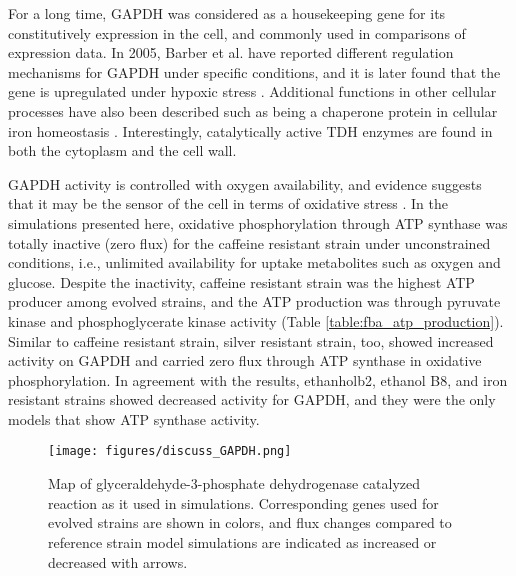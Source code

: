 For a long time, GAPDH was considered as a housekeeping gene for its constitutively expression in the cell, and commonly used in comparisons of expression data. In 2005, Barber et al. have reported different regulation mechanisms for GAPDH under specific conditions\cite{barber2005gapdh}, and it is later found that the gene is upregulated under hypoxic stress \cite{yang2008effects}. Additional functions in other cellular processes have also been described such as being a chaperone protein in cellular iron homeostasis \cite{sweeny2018glyceraldehyde}. Interestingly, catalytically active TDH enzymes are found in both the cytoplasm and the cell wall.

GAPDH activity is controlled with oxygen availability, and evidence suggests that it may be the sensor of the cell in terms of oxidative stress \cite{chuang2005glyceraldehyde}. In the simulations presented here, oxidative phosphorylation through ATP synthase was totally inactive (zero flux) for the caffeine resistant strain under unconstrained conditions, i.e., unlimited availability for uptake metabolites such as oxygen and glucose. Despite the inactivity, caffeine resistant strain was the highest ATP producer among evolved strains, and the ATP production was through pyruvate kinase and phosphoglycerate kinase activity (Table \ref{table:fba_atp_production}). Similar to caffeine resistant strain, silver resistant strain, too, showed increased activity on GAPDH and carried zero flux through ATP synthase in oxidative phosphorylation. In agreement with the results, ethanholb2, ethanol B8, and iron resistant strains showed decreased activity for GAPDH, and they were the only models that show ATP synthase activity.

\vspace{0.5cm}
\begin{figure}[H]
\texttt{[image: figures/discuss\_GAPDH.png]}
\caption[Map of glyceraldehyde-3-phosphate dehydrogenase catalyzed reaction as it used in simulations]{Map of glyceraldehyde-3-phosphate dehydrogenase catalyzed reaction as it used in simulations. Corresponding genes used for evolved strains are shown in colors, and flux changes compared to reference strain model simulations are indicated as increased or decreased with arrows.}
\label{fig:discuss_GAPDH}
\end{figure}

\vspace{-0.5cm}

